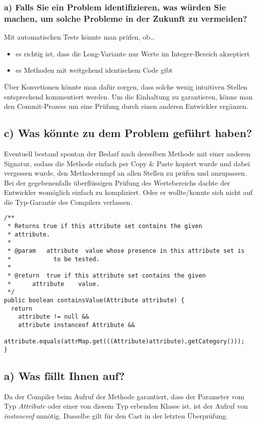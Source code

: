 \documentclass[a4paper,10pt]{article}
\begin{document}
\subsubsection*{a) Falls Sie ein Problem identifizieren, was würden Sie machen, um solche Probleme in der Zukunft zu vermeiden?}
Mit automatischen Tests könnte man prüfen, ob\dots \hfill
\begin{itemize}
 \item es richtig ist, dass die Long-Variante nur Werte im Integer-Bereich akzeptiert
 \item es Methoden mit weitgehend identischem Code gibt
\end{itemize}
Über Konvetionen könnte man dafür sorgen, dass solche wenig intuitiven Stellen entsprechend kommentiert werden. Um die Einhaltung zu garantieren, könne man den Commit-Prozess um eine Prüfung durch einen anderen Entwickler ergänzen.

\subsection*{c) Was könnte zu dem Problem geführt haben?}
Eventuell bestand spontan der Bedarf nach derselben Methode mit einer anderen Signatur, sodass die Methode einfach per Copy \& Paste kopiert wurde und dabei vergessen wurde, den Methoderumpf an allen Stellen zu prüfen und anzupassen. \\
Bei der gegebenenfalls überflüssigen Prüfung des Wertebereichs dachte der Entwickler womöglich einfach zu kompliziert. Oder er wollte/konnte sich nicht auf die Typ-Garantie des Compilers verlassen.

\begin{lstlisting}[caption={Methode \textit{containsValue}},label=lst:containsValue]
/**
 * Returns true if this attribute set contains the given
 * attribute.
 *
 * @param	attribute  value whose presence in this attribute set is
 *            to be tested.
 *
 * @return	true if this attribute set contains the given
 *      attribute    value.
 */
public boolean containsValue(Attribute attribute) {
  return
    attribute != null &&
    attribute instanceof Attribute &&
    attribute.equals(attrMap.get(((Attribute)attribute).getCategory()));
}
\end{lstlisting}

\subsection*{a) Was fällt Ihnen auf?}
Da der Compiler beim Aufruf der Methode garantiert, dass der Parameter vom Typ \textit{Attribute} oder einer von diesem Typ erbenden Klasse ist, ist der Aufruf von \textit{instanceof} unnötig. Dasselbe gilt für den Cast in der letzten Überprüfung.
\end{document}
